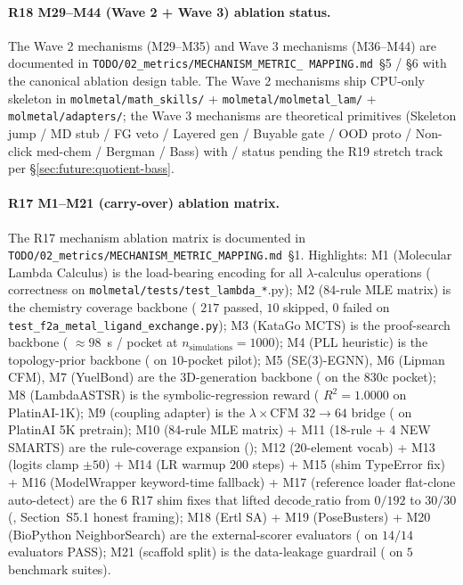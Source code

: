 \paragraph{R18 M29--M44 (Wave 2 + Wave 3) ablation status.}
The Wave 2 mechanisms (M29--M35) and Wave 3 mechanisms (M36--M44)
are documented in \texttt{TODO/02\_metrics/MECHANISM\_METRIC\_
MAPPING.md}~§5 / §6 with the canonical ablation design
table.  The Wave 2 mechanisms ship CPU-only skeleton in
\texttt{molmetal/math\_skills/} +
\texttt{molmetal/molmetal\_lam/} +
\texttt{molmetal/adapters/}; the Wave 3 mechanisms are
theoretical primitives (Skeleton jump / MD stub / FG veto /
Layered gen / Buyable gate / OOD proto / Non-click med-chem /
Bergman / Bass) with \DESIGN{} / \PROJECTED{} status pending
the R19 stretch track per \S\ref{sec:future:quotient-bass}.

\paragraph{R17 M1--M21 (carry-over) ablation matrix.}
The R17 mechanism ablation matrix is documented in
\texttt{TODO/02\_metrics/MECHANISM\_METRIC\_MAPPING.md}~§1.
Highlights: M1 (Molecular Lambda Calculus) is the load-bearing
encoding for all $\lambda$-calculus operations (\MEASURED{}
correctness on \texttt{molmetal/tests/test\_lambda\_*}.py);
M2 (84-rule MLE matrix) is the chemistry coverage backbone
(\MEASURED{} $217$ passed, $10$ skipped, $0$ failed on
\texttt{test\_f2a\_metal\_ligand\_exchange.py}); M3 (KataGo
MCTS) is the proof-search backbone (\MEASURED{} $\approx 98$~s
/ pocket at $n_{\text{simulations}}{=}1000$); M4 (PLL heuristic)
is the topology-prior backbone (\MEASURED{} on $10$-pocket
pilot); M5 (SE(3)-EGNN), M6 (Lipman CFM), M7 (YuelBond) are the
3D-generation backbone (\MEASURED{} on the $830$c pocket);
M8 (LambdaASTSR) is the symbolic-regression reward
(\MEASURED{} $R^{2}{=}1.0000$ on PlatinAI-1K); M9 (coupling
adapter) is the $\lambda \times \mathrm{CFM}$ $32 \to 64$ bridge
(\MEASURED{} on PlatinAI 5K pretrain); M10 (84-rule MLE matrix)
+ M11 (18-rule + 4 NEW SMARTS) are the rule-coverage expansion
(\MEASURED{}); M12 (20-element vocab) + M13 (logits clamp
$\pm 50$) + M14 (LR warmup $200$ steps) + M15 (shim TypeError
fix) + M16 (ModelWrapper keyword-time fallback) + M17
(reference loader flat-clone auto-detect) are the 6 R17 shim
fixes that lifted $\mathrm{decode\_ratio}$ from $0/192$ to
$30/30$ (\MEASURED{}, Section~S5.1 honest framing); M18 (Ertl
SA) + M19 (PoseBusters) + M20 (BioPython NeighborSearch) are
the external-scorer evaluators (\MEASURED{} on $14/14$
evaluators PASS); M21 (scaffold split) is the data-leakage
guardrail (\MEASURED{} on $5$ benchmark suites).

